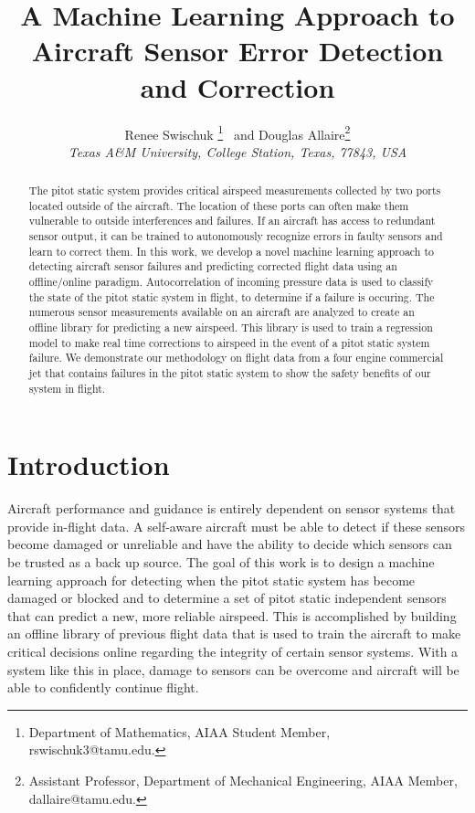 \documentclass[]{aiaa-tc}
\title{A Machine Learning Approach to Aircraft Sensor Error Detection and Correction}
\author{
  Renee Swischuk%
    \thanks{Department of Mathematics, AIAA Student Member, rswischuk3@tamu.edu.}
  \ and Douglas Allaire\thanks{Assistant Professor, Department of Mechanical Engineering, AIAA Member, dallaire@tamu.edu.}\\
  {\normalsize\itshape
   Texas A\&M University, College Station, Texas, 77843, USA}
 }
\begin{document}
\maketitle

\begin{abstract}
The pitot static system provides critical airspeed measurements collected by two ports located outside of the aircraft. The location of these ports can often make them vulnerable to outside interferences and failures. If an aircraft has access to redundant sensor output, it can be trained to autonomously recognize errors in faulty sensors and learn to correct them. In this work, we develop a novel machine learning approach to detecting aircraft sensor failures and predicting corrected flight data using an offline/online paradigm. Autocorrelation of incoming pressure data is used to classify the state of the pitot static system in flight, to determine if a failure is occuring. The numerous sensor measurements available on an aircraft are analyzed to create an offline library for predicting a new airspeed. This library is used to train a regression model to make real time corrections to airspeed in the event of a pitot static system failure. We demonstrate our methodology on flight data from a four engine commercial jet that contains failures in the pitot static system to show the safety benefits of our system in flight. 
\end{abstract}



\section{Introduction}
Aircraft performance and guidance is entirely dependent on sensor systems that provide in-flight data. A self-aware aircraft must be able to detect if these sensors become damaged or unreliable and have the ability to decide which sensors can be trusted as a back up source. The goal of this work is to design a machine learning approach for detecting when the pitot static system has become damaged or blocked and to determine a set of pitot static independent sensors that can predict a new, more reliable airspeed. This is accomplished by building an offline library of previous flight data that is used to train the aircraft to make critical decisions online regarding the integrity of certain sensor systems. With a system like this in place, damage to sensors can be overcome and aircraft will be able to confidently continue flight. 
\end{document}
